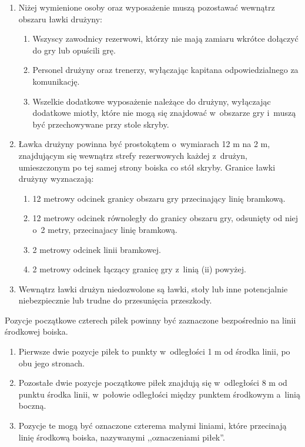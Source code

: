 \documentclass[12pt,a4paper]{article}
\renewcommand{\subsubsection}[1]{
  \oldsubsubsection{#1}%
  \leftskip1.3cm
}
\begin{document}
\begin{enumerate}
	\item Niżej wymienione osoby oraz wyposażenie muszą pozostawać wewnątrz
	      obszaru ławki drużyny:

	      \begin{enumerate}
		      \item Wszyscy zawodnicy rezerwowi, którzy nie mają zamiaru wkrótce
		            dołączyć do gry lub opuścili grę.
		      \item Personel drużyny oraz trenerzy, wyłączając kapitana odpowiedzialnego
		            za komunikację.
		      \item Wszelkie dodatkowe wyposażenie należące do drużyny, wyłączając
		            dodatkowe miotły, które nie mogą się znajdować w~obszarze gry i~muszą być przechowywane przy stole skryby.
	      \end{enumerate}

	\item Ławka drużyny powinna być prostokątem o~wymiarach 12 m na 2 m,
	      znajdującym się wewnątrz strefy rezerwowych każdej z~drużyn,
	      umieszczonym po tej samej strony boiska co stół skryby. Granice ławki
	      drużyny wyznaczają:

	      \begin{enumerate}
		      \item 12 metrowy odcinek granicy obszaru gry przecinający linię bramkową.
		      \item 12 metrowy odcinek równoległy do granicy obszaru gry, odsunięty od
		            niej o~2 metry, przecinajacy linię bramkową.
		      \item 2 metrowy odcinek linii bramkowej.
		      \item 2 metrowy odcinek łączący granicę gry z~linią (ii) powyżej.
	      \end{enumerate}

	\item Wewnątrz ławki drużyn niedozwolone są ławki, stoły lub inne
	      potencjalnie niebezpiecznie lub trudne do przesunięcia przeszkody.
\end{enumerate}

\subsubsection{Rozmieszczenie piłek}

Pozycje początkowe czterech piłek powinny być zaznaczone bezpośrednio na
linii środkowej boiska.
\begin{enumerate}
	\item Pierwsze dwie pozycje piłek to punkty w~odległości 1 m od środka
	      linii, po obu jego stronach.

	\item Pozostałe dwie pozycje początkowe piłek znajdują się w~odległości 8 m
	      od punktu środka linii, w~połowie odległości między punktem środkowym a~linią boczną.

	\item Pozycje te mogą być oznaczone czterema małymi liniami, które
	      przecinają linię środkową boiska, nazywanymi ,,oznaczeniami piłek''.
\end{enumerate}
\end{document}
